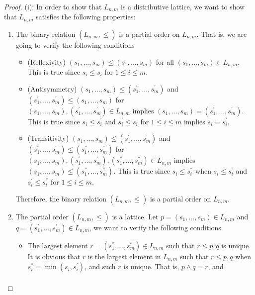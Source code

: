\begin{proof}
  (i): In order to show that $L_{n,m}$ is a distributive lattice, we want to show that $L_{n,m}$ satisfies the following properties:
  \begin{enumerate}[label=(\alph*)]
    \item The binary relation $(L_{n,m}, \leq)$ is a partial order on $L_{n,m}$. That is, we are going to verify the following conditions       \begin{itemize}
        \item (Reflexivity) $(s_{1}, \ldots, s_{m}) \leq (s_{1}, \ldots, s_{m})$ for all $(s_{1}, \ldots, s_{m}) \in L_{n,m}$. This is true since $s_{i} \leq s_{i}$ for $1 \leq i \leq m$.
        \item (Antisymmetry) $(s_{1}, \ldots, s_{m}) \leq (s_{1}^{'}, \ldots, s_{m}^{'})$ and $(s_{1}^{'}, \ldots, s_{m}^{'}) \leq (s_{1}, \ldots, s_{m})$ for \\ $(s_{1}, \ldots, s_{m}), (s_{1}^{'}, \ldots, s_{m}^{'}) \in L_{n,m}$ implies $(s_{1}, \ldots, s_{m}) = (s_{1}^{'}, \ldots, s_{m}^{'})$. This is true since $s_{i} \leq s_{i}^{'}$ and $s_{i}^{'} \leq s_{i}$ for $1 \leq i \leq m$ implies $s_{i} = s_{i}^{'}$.
        \item (Transitivity) $(s_{1}, \ldots, s_{m}) \leq (s_{1}^{'}, \ldots, s_{m}^{'})$ and $(s_{1}^{'}, \ldots, s_{m}^{'}) \leq (s_{1}^{''}, \ldots, s_{m}^{''})$ for \\ $(s_{1}, \ldots, s_{m}), (s_{1}^{'}, \ldots, s_{m}^{'}), (s_{1}^{''}, \ldots, s_{m}^{''}) \in L_{n,m}$ implies $(s_{1}, \ldots, s_{m}) \leq (s_{1}^{''}, \ldots, s_{m}^{''})$. This is true since $s_{i} \leq s_{i}^{''}$ when $s_{i} \leq s_{i}^{'}$ and $s_{i}^{'} \leq s_{i}^{''}$ for $1 \leq i \leq m$.
      \end{itemize}
      Therefore, the binary relation $(L_{n,m}, \leq)$ is a partial order on $L_{n,m}$.
    \item The partial order $(L_{n,m}, \leq)$ is a lattice. Let $p = (s_{1}, \ldots, s_{m}) \in L_{n,m}$ and $q = (s_{1}^{'}, \ldots, s_{m}^{'}) \in L_{n,m}$, we want to verify the following conditions
      \begin{itemize}
        \item The largest element $r = (s_{1}^{''}, \ldots, s_{m}^{''}) \in L_{n,m}$ such that $r \leq p,q$ is unique. It is obvious that $r$ is the largest element in $L_{n,m}$ such that $r \leq p,q$ when $s_{i}^{''} = \min(s_{i}, s_{i}^{'})$, and such $r$ is unique. That is, $p \wedge q = r$, and
          \begin{align*}

\end{align*}
\end{itemize}
\end{enumerate}
\end{proof}
